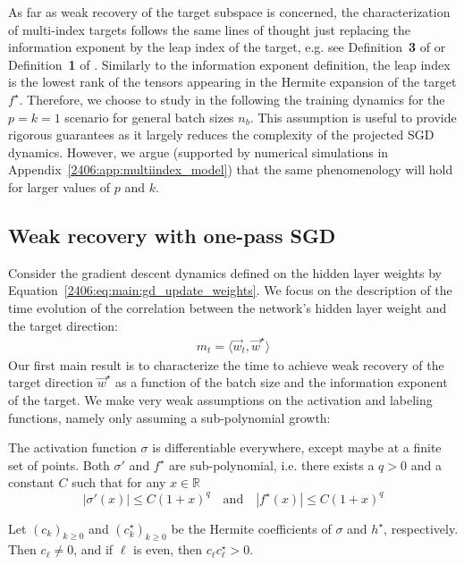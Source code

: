 As far as weak recovery of the target subspace is concerned, the characterization of multi-index targets follows the same lines of thought just replacing the information exponent by the leap index of the target, e.g. see Definition~\textbf{3} of \cite{dandi2023how} or Definition~\textbf{1} of \cite{abbe2023sgd}. 
Similarly to the information exponent definition, the leap index is the lowest rank of the tensors appearing in the Hermite expansion of the target $f^\star$. 
Therefore, we choose to study in the following the training dynamics for the $p=k=1$ scenario for general batch sizes $n_b$. 
This assumption is useful to provide rigorous guarantees as it largely reduces the complexity of the projected SGD dynamics. However, we argue (supported by numerical simulations in Appendix~\ref{2406:app:multiindex_model}) that the same phenomenology will hold for larger values of $p$ and $k$. 


\subsection{Weak recovery with one-pass SGD}
Consider the gradient descent dynamics defined on the hidden layer weights by Equation~\eqref{2406:eq:main:gd_update_weights}. We focus on the description of the time evolution of the correlation between the network's hidden layer weight and the target direction:
\begin{align}
    m_t= \langle \vec w_t , \vec w^\star \rangle 
\end{align}
Our first main result is to characterize the time to achieve weak recovery of the target direction $\vec w^\star$ as a function of the batch size and the information exponent of the target. We make very weak assumptions on the activation and labeling functions, namely only assuming a sub-polynomial growth:
\begin{assumption}\label{2406:assump:poly_growth}
    The activation function $\sigma$ is differentiable everywhere, except maybe at a finite set of points. Both $\sigma'$ and $f^\star$ are sub-polynomial, i.e. there exists a $q > 0$ and a constant $C$ such that for any $x\in \mathbb R$
    \begin{equation}
        |\sigma'(x)|\leq C(1+x)^q \quad \text{and} \quad |f^\star(x)|\leq C(1+x)^q
    \end{equation}
\end{assumption}

\begin{assumption}\label{2406:assump:well_posed}
    Let $(c_k)_{k \geq 0}$ and $(c_k^\star)_{k\geq 0}$ be the Hermite coefficients of $\sigma$ and $h^\star$, respectively. Then $c_\ell \neq 0$, and if $\ell$ is even, then $c_\ell c_\ell^\star > 0$.
\end{assumption}

